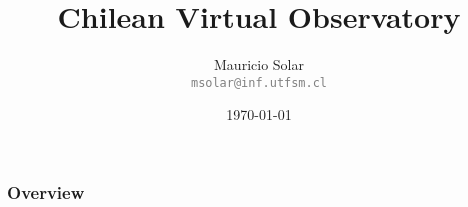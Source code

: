 \documentclass{beamer}
\title[Short title]{\huge{Chilean Virtual Observatory}}
\author{Mauricio Solar \\
        \small{\textcolor{gray}{\texttt{msolar@inf.utfsm.cl}}}}
\institute[CSRG-UTFSM]{
Universidad Técnica Fedrico Santa María
}
\date{\today}
\begin{document}
\begin{frame}[t,plain]
\titlepage
\end{frame}



\begin{frame}
	\frametitle{Overview}
	\tableofcontents
\end{frame}








\begin{frame}[t,plain]
\titlepage
\end{frame}
\end{document}
